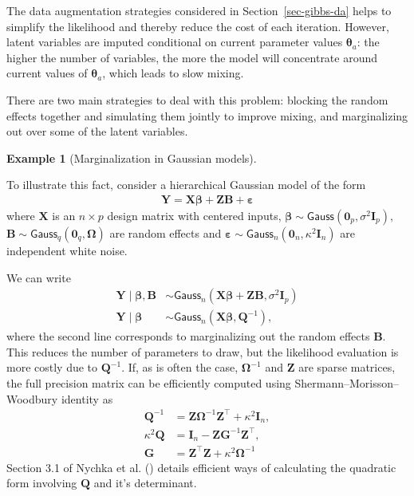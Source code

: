 \documentclass[
  11pt,
  letterpaper,
]{scrbook}
\theoremstyle{definition}
\theoremstyle{definition}
\newtheorem{example}{Example}[chapter]
\theoremstyle{definition}
\theoremstyle{plain}
\theoremstyle{plain}
\theoremstyle{plain}
\theoremstyle{remark}
\begin{document}
The data augmentation strategies considered in
Section~\ref{sec-gibbs-da} helps to simplify the likelihood and thereby
reduce the cost of each iteration. However, latent variables are imputed
conditional on current parameter values \(\boldsymbol{\theta}_a\): the
higher the number of variables, the more the model will concentrate
around current values of \(\boldsymbol{\theta}_a\), which leads to slow
mixing.

There are two main strategies to deal with this problem: blocking the
random effects together and simulating them jointly to improve mixing,
and marginalizing out over some of the latent variables.

\begin{example}[Marginalization in Gaussian
models]\protect\hypertarget{exm-marginalization-Gauss}{}\label{exm-marginalization-Gauss}

To illustrate this fact, consider a hierarchical Gaussian model of the
form \begin{align*}
\boldsymbol{Y} = \mathbf{X}\boldsymbol{\beta} + \mathbf{Z}\boldsymbol{B} + \boldsymbol{\varepsilon}
\end{align*} where \(\mathbf{X}\) is an \(n \times p\) design matrix
with centered inputs,
\(\boldsymbol{\beta} \sim \mathsf{Gauss}(\boldsymbol{0}_p, \sigma^2\mathbf{I}_p),\)
\(\boldsymbol{B}\sim \mathsf{Gauss}_q(\boldsymbol{0}_q, \boldsymbol{\Omega})\)
are random effects and
\(\boldsymbol{\varepsilon} \sim \mathsf{Gauss}_n(\boldsymbol{0}_n, \kappa^2\mathbf{I}_n)\)
are independent white noise.

We can write \begin{align*}
\boldsymbol{Y} \mid \mathbf{\beta}, \boldsymbol{B} &\sim \mathsf{Gauss}_n(\mathbf{X}\boldsymbol{\beta} + \mathbf{Z}\boldsymbol{B},  \sigma^2\mathbf{I}_p)\\
\boldsymbol{Y} \mid \mathbf{\beta} &\sim \mathsf{Gauss}_n(\mathbf{X}\boldsymbol{\beta}, \mathbf{Q}^{-1}),
\end{align*} where the second line corresponds to marginalizing out the
random effects \(\boldsymbol{B}.\) This reduces the number of parameters
to draw, but the likelihood evaluation is more costly due to
\(\mathbf{Q}^{-1}\). If, as is often the case,
\(\boldsymbol{\Omega}^{-1}\) and \(\mathbf{Z}\) are sparse matrices, the
full precision matrix can be efficiently computed using
Shermann--Morisson--Woodbury identity as \begin{align*}
\mathbf{Q}^{-1} &=   \mathbf{Z}\boldsymbol{\Omega}^{-1}\mathbf{Z}^\top + \kappa^2 \mathbf{I}_n,\\
\kappa^2\mathbf{Q} & = \mathbf{I}_n - \mathbf{Z} \boldsymbol{G}^{-1} \mathbf{Z}^\top,\\
\boldsymbol{G} &= \mathbf{Z}^\top\mathbf{Z} + \kappa^2 \boldsymbol{\Omega}^{-1}
\end{align*} Section 3.1 of Nychka et al.
() details efficient ways of calculating
the quadratic form involving \(\mathbf{Q}\) and it's determinant.

\end{example}
\end{document}
